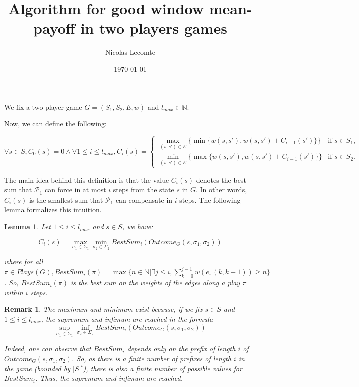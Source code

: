 \documentclass{article}
\title{Algorithm for good window mean-payoff in two players games}
\author{Nicolas Lecomte}
\date{\today}
\newcommand{\IN}{\mathbb{N}}
\theoremstyle{plain}
\newtheorem{lem}[thm]{Lemma}
\newtheorem{rem}{Remark}
\begin{document}
\maketitle

We fix a two-player game $G = (S_1, S_2, E, w)$ and $l_{max} \in \IN$.

Now, we can define the following:

\[\forall s \in S, C_0(s)=0 \wedge \forall 1 \leqslant i \leqslant l_{max}, C_i(s) =
\begin{cases}
\max_{(s, s') \in E} \{ \min \{w(s, s'), w(s, s') + C_{i-1}(s')\} \} & \text{if } s \in S_1,\\
\min_{(s, s') \in E} \{ \max \{w(s, s'), w(s, s') + C_{i-1}(s')\} \} & \text{if } s \in S_2.
\end{cases}
\]

The main idea behind this definition is that the value $C_i(s)$ denotes the best sum that $\mathcal{P}_1$ can force in at most $i$ steps from the state $s$ in $G$. In other words, $C_i(s)$ is the smallest sum that $\mathcal{P}_1$ can compensate in $i$ steps. The following lemma formalizes this intuition.

\begin{lem}
Let $1 \leqslant i \leqslant l_{max}$ and $s \in S$, we have:

\[ C_i(s) = \max_{\sigma_1 \in \Sigma_1} \min_{\sigma_2 \in \Sigma_2} BestSum_i(Outcome_G(s, \sigma_1, \sigma_2)) \]

where for all $\pi \in Plays(G), BestSum_i(\pi) = \max \{n \in \IN | \exists j \leqslant i, \sum_{k=0}^{j-1} w(e_\pi (k, k+1)) \geqslant n \}$. So, $BestSum_i(\pi)$ is the best sum on the weights of the edges along a play $\pi$ within $i$ steps.

\end{lem}

\begin{rem}
The maximum and minimum exist because, if we fix $s \in S$ and $1 \leqslant i \leqslant l_{max}$, the supremum and infimum are reached in the formula $$\sup_{\sigma_1 \in \Sigma_1} \inf_{\sigma_2 \in \Sigma_2} BestSum_i(Outcome_G(s, \sigma_1, \sigma_2))$$

Indeed, one can observe that $BestSum_i$ depends only on the prefix of length $i$ of $Outcome_G(s, \sigma_1, \sigma_2)$. So, as there is a finite number of prefixes of length $i$ in the game (bounded by $|S|^i$), there is also a finite number of possible values for $BestSum_i$. Thus, the supremum and infimum are reached.
\end{rem}
\end{document}
